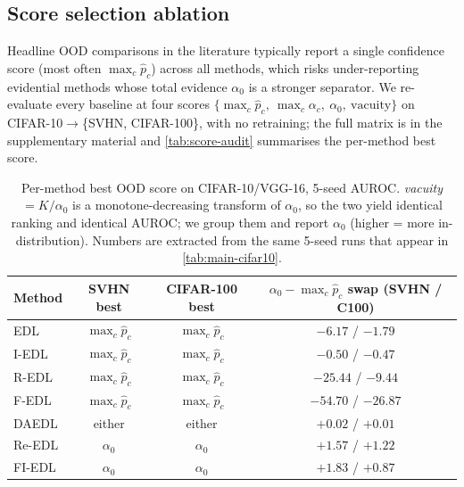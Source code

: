 \documentclass[review,5p,times]{elsarticle}
\begin{document}
\subsection{Score selection ablation}\label{sec:score-ablation}

Headline OOD comparisons in the literature typically report a single
confidence score (most often $\max_c\hat p_c$) across all methods, which
risks under-reporting evidential methods whose total evidence $\alpha_0$
is a stronger separator. We re-evaluate every baseline at four scores
$\{\max_c\hat p_c,\ \max_c\alpha_c,\ \alpha_0,\ \text{vacuity}\}$ on
CIFAR-10$\to$\{SVHN, CIFAR-100\}, with no retraining; the full matrix is
in the supplementary material and \autoref{tab:score-audit} summarises
the per-method best score.

\begin{table}[t]
  \centering
  \caption{Per-method best OOD score on CIFAR-10/VGG-16, 5-seed AUROC.
    \emph{vacuity} $=\!K/\alpha_0$ is a monotone-decreasing transform of
    $\alpha_0$, so the two yield identical ranking and identical AUROC;
    we group them and report $\alpha_0$ (higher = more in-distribution).
    Numbers are extracted from the same 5-seed runs that appear in
    \autoref{tab:main-cifar10}.}
  \label{tab:score-audit}
  \small
  \begin{tabular}{lccc}
    \toprule
    Method & SVHN best & CIFAR-100 best & $\alpha_0\!-\!\max_c\hat p_c$ swap (SVHN / C100) \\
    \midrule
    EDL    & $\max_c\hat p_c$ & $\max_c\hat p_c$ & $-6.17$ / $-1.79$ \\
    I-EDL  & $\max_c\hat p_c$ & $\max_c\hat p_c$ & $-0.50$ / $-0.47$ \\
    R-EDL  & $\max_c\hat p_c$ & $\max_c\hat p_c$ & $-25.44$ / $-9.44$ \\
    F-EDL  & $\max_c\hat p_c$ & $\max_c\hat p_c$ & $-54.70$ / $-26.87$ \\
    DAEDL  & either           & either           & $+0.02$ / $+0.01$ \\
    Re-EDL & $\alpha_0$       & $\alpha_0$       & $+1.57$ / $+1.22$ \\
    FI-EDL & $\alpha_0$       & $\alpha_0$       & $+1.83$ / $+0.87$ \\
    \bottomrule
  \end{tabular}
\end{table}
\end{document}
